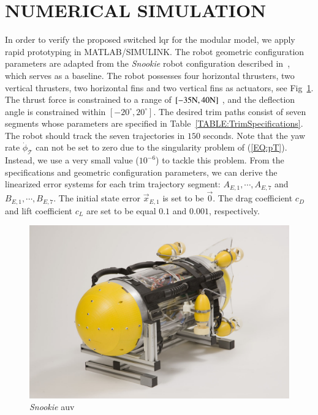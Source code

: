
\section{NUMERICAL SIMULATION}
In order to verify the proposed switched \ac{lqr} for the modular model, we apply rapid prototyping in MATLAB/SIMULINK. The robot geometric configuration parameters are adapted from the \emph{Snookie} robot configuration described in~\cite{c9}, which serves as a baseline. The robot possesses four horizontal thrusters, two vertical thrusters, two horizontal fins and two vertical fins as actuators, see Fig~\ref{snookie}. The thrust force is constrained to a range of $[-35\textup{N},40\textup{N}]$ , and the deflection angle is constrained within $[-20^\circ,20^\circ]$. The desired trim paths consist of seven segments whose parameters are specified in Table~\ref{TABLE:TrimSpecifications}. The robot should track the seven trajectories in $150$ seconds. Note that the yaw rate $\dot{\phi}_{\mathcal{T}}$ can not be set to zero due to the singularity problem of (\ref{EQ:pT}). Instead, we use a very small value ($10^{-6}$) to tackle this problem. From the specifications and geometric configuration parameters, we can derive the linearized error systems for each trim trajectory segment: $A_{E,1}, \cdots, A_{E,7}$ and $B_{E,1}, \cdots, B_{E,7}$. The initial state error $\vec{x}_{E,1}$ is set to be $\vec{0}$. The drag coefficient $c_{D}$ and lift coefficient $c_{L}$ are set to be equal $0.1$ and $0.001$, respectively. 

\begin{figure}[htb]
	\begin{center}
		\includegraphics[width=.3\textwidth]{figures/Cotesys_Snookie_150dpi}
		\caption{\emph{Snookie} \ac{auv}}
		\label{snookie}
	\end{center}
\end{figure}
   
